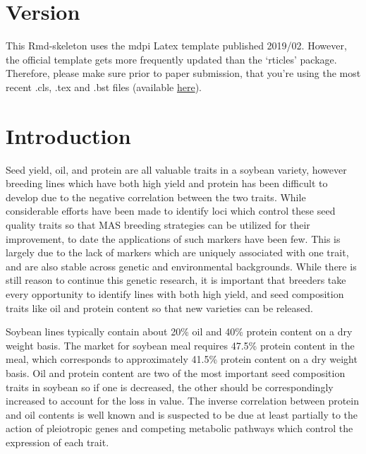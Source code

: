 \documentclass[Agronomy,article,submit,moreauthors,pdftex]{mdpi}
\begin{document}

\hypertarget{version}{%
\section{Version}\label{version}}

This Rmd-skeleton uses the mdpi Latex template published 2019/02.
However, the official template gets more frequently updated than the
`rticles' package. Therefore, please make sure prior to paper
submission, that you're using the most recent .cls, .tex and .bst files
(available \href{http://www.mdpi.com/authors/latex}{here}).

\hypertarget{introduction}{%
\section{Introduction}\label{introduction}}

Seed yield, oil, and protein are all valuable traits in a soybean
variety, however breeding lines which have both high yield and protein
has been difficult to develop due to the negative correlation between
the two
traits\citep{burton1987quantitative, ProtOilCorr, ProtOilCorr_new}.
While considerable efforts have been made to identify loci which control
these seed quality traits so that MAS breeding strategies can be
utilized for their improvement, to date the applications of such markers
have been few. This is largely due to the lack of markers which are
uniquely associated with one trait, and are also stable across genetic
and environmental backgrounds. While there is still reason to continue
this genetic research, it is important that breeders take every
opportunity to identify lines with both high yield, and seed composition
traits like oil and protein content so that new varieties can be
released.

Soybean lines typically contain about 20\% oil and 40\% protein content
on a dry weight basis\citep{ProteinGenomics}. The market for soybean
meal requires 47.5\% protein content in the meal, which corresponds to
approximately 41.5\% protein content on a dry weight
basis\citep{ProteinGenomics}. Oil and protein content are two of the
most important seed composition traits in soybean so if one is
decreased, the other should be correspondingly increased to account for
the loss in value. The inverse correlation between protein and oil
contents is well known and is suspected to be due at least partially to
the action of pleiotropic genes and competing metabolic pathways which
control the expression of each trait\citep{SeedCompositionGenomics}.
\end{document}
